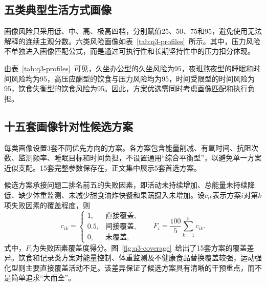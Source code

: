 \subsection{五类典型生活方式画像}

画像风险只采用低、中、高、极高四档，分别赋值25、50、75和95，避免使用无法解释的连续主观分数。六类风险画像如表~\ref{tab:q3-profiles}~所示。其中，压力风险不单独进入画像匹配公式，而是通过可执行性和长期坚持性中的压力扣分体现。

\begin{table}[H]
\centering
\small
\caption{五类典型工作生活方式画像}
\label{tab:q3-profiles}
\end{table}

由表~\ref{tab:q3-profiles}~可见，久坐办公型的久坐风险为95，夜班熬夜型的睡眠和时间风险均为95，高压应酬型的饮食与压力风险均为95，时间受限型的时间风险为95，饮食失衡型的饮食风险为95。因此，方案优选需同时考虑画像匹配和执行负担。

\subsection{十五套画像针对性候选方案}

每类画像设置3套不同优先方向的方案。各方案包含能量削减、有氧时间、抗阻次数、监测频率、睡眠目标和时间负担，不设置通用“综合平衡型”，以避免单一方案近似支配。15套完整参数保存在，正文集中展示5套首选方案。

候选方案承接问题二排名前五的失败因素，即活动未持续增加、总能量未持续降低、缺少体重监测、未减少甜食油炸快餐和果蔬摄入未增加。设$c_{ik}$表示方案$i$对第$k$项失败因素的覆盖程度，则
\begin{equation}
c_{ik}=
\begin{cases}
1, & \text{直接覆盖},\\
0.5, & \text{间接覆盖},\\
0, & \text{未覆盖},
\end{cases}
\qquad
F_i=\frac{100}{5}\sum_{k=1}^{5}c_{ik}.
\end{equation}
式中，$F_i$为失败因素覆盖度得分。图~\ref{fig:q3-coverage}~给出了15套方案的覆盖差异。饮食和记录类方案对能量控制、体重监测及不健康食品替换覆盖较强，运动强化型则主要直接覆盖活动不足。该差异保证了候选方案具有清晰的干预重点，而不是简单追求“大而全”。

